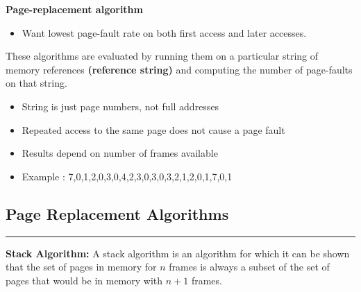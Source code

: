 \documentclass[12pt,onecolumn]{IEEEtran}
\begin{document}
\textbf{Page-replacement algorithm}

\begin{itemize}
	\item Want lowest page-fault rate on both first access and later accesses.
\end{itemize}
These algorithms are evaluated by running them on a particular string of memory
references \textbf{(reference string)} and computing the number of page-faults on that string.
\begin{itemize}
	\item String is just page numbers, not full addresses
	\item Repeated access to the same page does not cause a page fault
	\item Results depend on number of frames available
	\item Example : 7,0,1,2,0,3,0,4,2,3,0,3,0,3,2,1,2,0,1,7,0,1
\end{itemize}

\subsection{Page Replacement Algorithms}
\hrule
\vspace{3mm}

\textbf{Stack Algorithm: }A stack algorithm is an
algorithm for which it can be shown that the set of pages in memory for $n$
frames is always a subset of the set of pages that would be in memory with $n+1$ frames.
\vspace{3mm}
\end{document}
